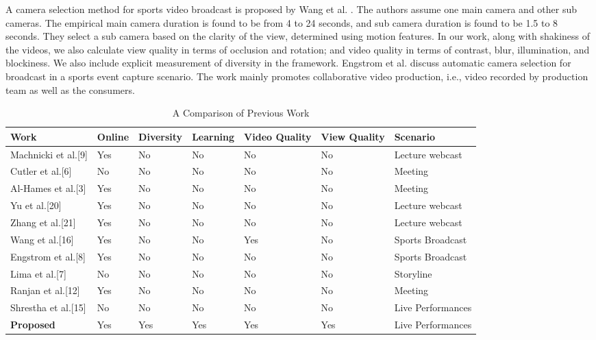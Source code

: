 \documentclass{sig-alternate}
\begin{document}
 A camera selection method for sports video broadcast is proposed by Wang et al. \cite{paddle2006effect}. The authors assume one main camera and other sub cameras. The empirical main camera duration is found to be from 4 to 24 seconds, and sub camera duration is found to be 1.5 to 8 seconds. They select a sub camera based on the clarity of the view, determined using motion features. In our work, along with shakiness of the videos, we also calculate view quality in terms of occlusion and rotation; and video quality in terms of contrast, blur, illumination, and blockiness. We also include explicit measurement of diversity in the framework. Engstrom et al. \cite{clayton1987materials} discuss automatic camera selection for broadcast in a sports event capture scenario. The work mainly promotes collaborative video production, i.e., video recorded by production team as well as the consumers.
\begin{table}
\centering
\caption{ A Comparison of Previous Work }
\begin{tabular}{p{3cm}|p{2cm}|p{2cm}|p{2cm}|p{2cm}|p{2cm}|p{3cm}} \hline
Work& Online &Diversity& Learning& Video  Quality & View Quality & Scenario\\
\hline
Machnicki et al.[9] & Yes & No & No & No  & No & Lecture webcast\\
\hline
Cutler et al.[6] & No &  No & No  & No  & No & Meeting\\
\hline
Al-Hames et al.[3] & Yes & No &  No  & No & No &  Meeting\\
\hline
Yu et al.[20] & Yes & No & No  & No  & No & Lecture webcast\\
\hline
Zhang et al.[21] & Yes & No &  No  & No  & No & Lecture webcast\\
\hline
Wang et al.[16] & Yes & No & No  & Yes  & No & Sports Broadcast\\
\hline
Engstrom et al.[8]  & Yes & No & No  & No  & No & Sports Broadcast\\
\hline
Lima et al.[7] & No & No & No  & No  & No & Storyline\\
\hline
Ranjan et al.[12] & Yes & No & No  & No  & No & Meeting\\
\hline
Shrestha et al.[15] & No & No & No  & No  & No & Live Performances\\
\hline
\textbf{Proposed} & Yes & Yes & Yes  & Yes  & Yes & Live Performances\\
\hline
\end{tabular}
\end{table}
 
\end{document}
